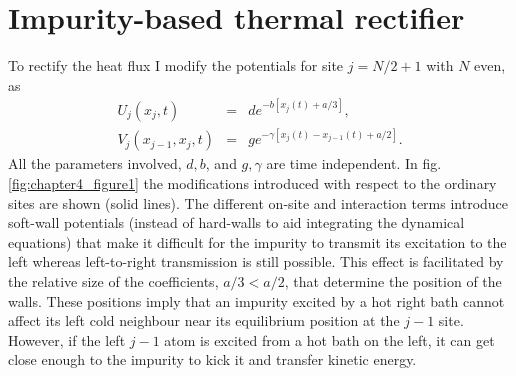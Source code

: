 \section{Impurity-based thermal rectifier \label{sec:Impurity_rectifier}}

To rectify the heat flux I modify the potentials for site $j=N/2+1$ with $N$ even, as
%
%
\begin{eqnarray}
\label{IMP}
U_j(x_j,t)&=&d e^{-b [x_j(t)+a/3]},
\\
V_j(x_{j-1},x_j,t)&=&ge^{-\gamma [x_j(t)-x_{j-1}(t)+a/2]}.
\end{eqnarray}
%
All the parameters involved, $d, b$, and $g,\gamma$ are time independent. In fig. \ref{fig:chapter4_figure1} the modifications introduced with respect to the ordinary sites are shown (solid lines).  The different on-site and interaction terms introduce soft-wall potentials
(instead of hard-walls to aid integrating the dynamical equations) that make it difficult for the impurity to transmit its excitation to the left whereas left-to-right transmission is still possible.
This effect is facilitated by the relative size of the coefficients, $a/3<a/2$, that determine the position of the walls.
These positions imply that an impurity excited by a hot right bath cannot affect its left cold neighbour near its equilibrium position at the $j-1$ site.
However, if the left $j-1$ atom is excited from a hot bath on the left,
it can get close enough to the impurity to kick it and transfer kinetic energy.

